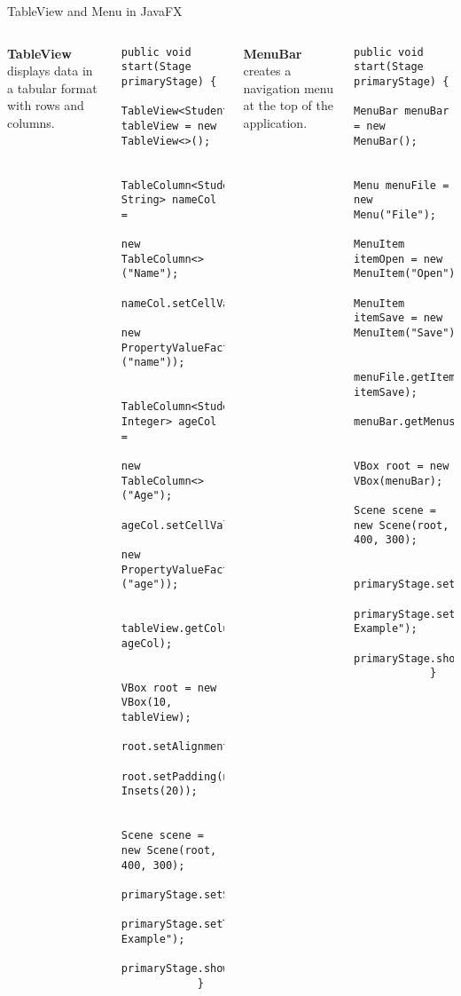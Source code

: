 \documentclass[aspectratio=169, table]{beamer}
\begin{document}
\begin{frame}[fragile]{TableView and Menu in JavaFX}
	\vspace{30pt}
	\begin{columns}[t]
		\textbf{TableView} displays data in a tabular format with rows and columns.
		\begin{lstlisting}[style=JavaStyle]
			public void start(Stage primaryStage) {
				TableView<Student> tableView = new TableView<>();
				
				TableColumn<Student, String> nameCol = 
				new TableColumn<>("Name");
				nameCol.setCellValueFactory(
				new PropertyValueFactory<>("name"));
				
				TableColumn<Student, Integer> ageCol = 
				new TableColumn<>("Age");
				ageCol.setCellValueFactory(
				new PropertyValueFactory<>("age"));
				
				tableView.getColumns().addAll(nameCol, ageCol);
				
				VBox root = new VBox(10, tableView);
				root.setAlignment(Pos.CENTER);
				root.setPadding(new Insets(20));
				
				Scene scene = new Scene(root, 400, 300);
				primaryStage.setScene(scene);
				primaryStage.setTitle("TableView Example");
				primaryStage.show();
			}
		\end{lstlisting}
		
		\textbf{MenuBar} creates a navigation menu at the top of the application.
		\begin{lstlisting}[style=JavaStyle]
			public void start(Stage primaryStage) {
				MenuBar menuBar = new MenuBar();
				
				Menu menuFile = new Menu("File");
				MenuItem itemOpen = new MenuItem("Open");
				MenuItem itemSave = new MenuItem("Save");
				
				menuFile.getItems().addAll(itemOpen, itemSave);
				menuBar.getMenus().add(menuFile);
				
				VBox root = new VBox(menuBar);
				Scene scene = new Scene(root, 400, 300);
				
				primaryStage.setScene(scene);
				primaryStage.setTitle("MenuBar Example");
				primaryStage.show();
			}
		\end{lstlisting}
	\end{columns}
\end{frame}
\end{document}
